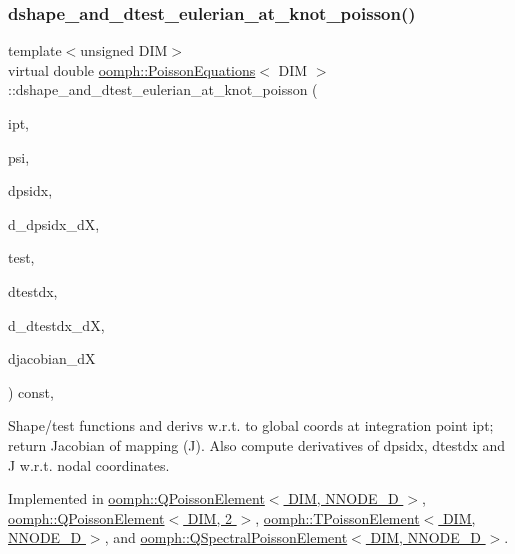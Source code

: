\subsubsection{\texorpdfstring{dshape\+\_\+and\+\_\+dtest\+\_\+eulerian\+\_\+at\+\_\+knot\+\_\+poisson()}{dshape\_and\_dtest\_eulerian\_at\_knot\_poisson()}\hspace{0.1cm}{\footnotesize\ttfamily [2/2]}}
{\footnotesize\ttfamily template$<$unsigned D\+IM$>$ \\
virtual double \hyperlink{classoomph_1_1PoissonEquations}{oomph\+::\+Poisson\+Equations}$<$ D\+IM $>$\+::dshape\+\_\+and\+\_\+dtest\+\_\+eulerian\+\_\+at\+\_\+knot\+\_\+poisson (\begin{DoxyParamCaption}\item[{const unsigned \&}]{ipt,  }\item[{\hyperlink{classoomph_1_1Shape}{Shape} \&}]{psi,  }\item[{\hyperlink{classoomph_1_1DShape}{D\+Shape} \&}]{dpsidx,  }\item[{\hyperlink{classoomph_1_1RankFourTensor}{Rank\+Four\+Tensor}$<$ double $>$ \&}]{d\+\_\+dpsidx\+\_\+dX,  }\item[{\hyperlink{classoomph_1_1Shape}{Shape} \&}]{test,  }\item[{\hyperlink{classoomph_1_1DShape}{D\+Shape} \&}]{dtestdx,  }\item[{\hyperlink{classoomph_1_1RankFourTensor}{Rank\+Four\+Tensor}$<$ double $>$ \&}]{d\+\_\+dtestdx\+\_\+dX,  }\item[{\hyperlink{classoomph_1_1DenseMatrix}{Dense\+Matrix}$<$ double $>$ \&}]{djacobian\+\_\+dX }\end{DoxyParamCaption}) const\hspace{0.3cm}{\ttfamily [protected]}, {}}



Shape/test functions and derivs w.\+r.\+t. to global coords at integration point ipt; return Jacobian of mapping (J). Also compute derivatives of dpsidx, dtestdx and J w.\+r.\+t. nodal coordinates. 



Implemented in \hyperlink{classoomph_1_1QPoissonElement_a0e919ee36672fdf05dedad29d8e53b8a}{oomph\+::\+Q\+Poisson\+Element$<$ D\+I\+M, N\+N\+O\+D\+E\+\_\+D $>$}, \hyperlink{classoomph_1_1QPoissonElement_a0e919ee36672fdf05dedad29d8e53b8a}{oomph\+::\+Q\+Poisson\+Element$<$ D\+I\+M, 2 $>$}, \hyperlink{classoomph_1_1TPoissonElement_af4a23d9088cdc834530545fd554ab906}{oomph\+::\+T\+Poisson\+Element$<$ D\+I\+M, N\+N\+O\+D\+E\+\_\+D $>$}, and \hyperlink{classoomph_1_1QSpectralPoissonElement_a20e5c72a2d391708edb7dd2e53666810}{oomph\+::\+Q\+Spectral\+Poisson\+Element$<$ D\+I\+M, N\+N\+O\+D\+E\+\_\+D $>$}.

